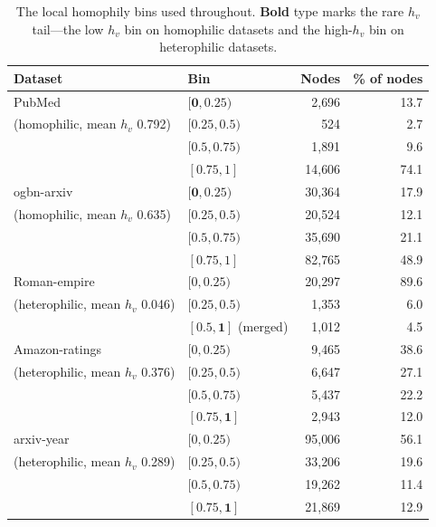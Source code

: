 \begin{table}[H]
    \centering\footnotesize
    \begin{tabular}{@{}llrr}
        \toprule
        Dataset & Bin & Nodes & \% of nodes\\
        \midrule
        PubMed & $\mathbf{[0,0.25)}$ & 2{,}696 & 13.7\\
        (homophilic, mean $h_v$ 0.792) & $[0.25,0.5)$ & 524 & 2.7\\
         & $[0.5,0.75)$ & 1{,}891 & 9.6\\
         & $[0.75,1]$ & 14{,}606 & 74.1\\
        \midrule
        ogbn-arxiv & $\mathbf{[0,0.25)}$ & 30{,}364 & 17.9\\
        (homophilic, mean $h_v$ 0.635) & $[0.25,0.5)$ & 20{,}524 & 12.1\\
         & $[0.5,0.75)$ & 35{,}690 & 21.1\\
         & $[0.75,1]$ & 82{,}765 & 48.9\\
        \midrule
        Roman-empire & $[0,0.25)$ & 20{,}297 & 89.6\\
        (heterophilic, mean $h_v$ 0.046) & $[0.25,0.5)$ & 1{,}353 & 6.0\\
         & $\mathbf{[0.5,1]}$ (merged) & 1{,}012 & 4.5\\
        \midrule
        Amazon-ratings & $[0,0.25)$ & 9{,}465 & 38.6\\
        (heterophilic, mean $h_v$ 0.376) & $[0.25,0.5)$ & 6{,}647 & 27.1\\
         & $[0.5,0.75)$ & 5{,}437 & 22.2\\
         & $\mathbf{[0.75,1]}$ & 2{,}943 & 12.0\\
        \midrule
        arxiv-year & $[0,0.25)$ & 95{,}006 & 56.1\\
        (heterophilic, mean $h_v$ 0.289) & $[0.25,0.5)$ & 33{,}206 & 19.6\\
         & $[0.5,0.75)$ & 19{,}262 & 11.4\\
         & $\mathbf{[0.75,1]}$ & 21{,}869 & 12.9\\
        \bottomrule
    \end{tabular}
    \caption{
        The local homophily bins used throughout. \textbf{Bold} type marks the rare \(h_v\) tail---the low \(h_v\) bin on homophilic datasets and the high-\(h_v\) bin on heterophilic datasets.
    }
    \label{tab:groups}
\end{table}
